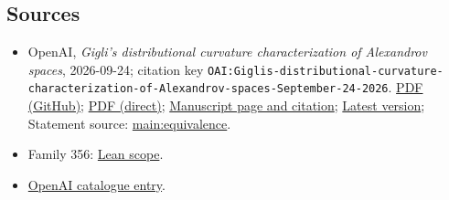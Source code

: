 \documentclass[11pt]{article}
\begin{document}
\subsection{Sources}
\begin{itemize}
\item OpenAI, \emph{Gigli's distributional curvature characterization of Alexandrov spaces}, 2026-09-24; citation key \texttt{OAI:Giglis-distributional-curvature-characterization-of-Alexandrov-spaces-September-24-2026}. \href{https://github.com/openai/math/blob/adc7f1241b42e322a6451854ab7e4b4c146bf78a/preprints/Giglis-distributional-curvature-characterization-of-Alexandrov-spaces-September-24-2026/main.pdf}{PDF (GitHub)}; \href{https://github.com/openai/math/raw/adc7f1241b42e322a6451854ab7e4b4c146bf78a/preprints/Giglis-distributional-curvature-characterization-of-Alexandrov-spaces-September-24-2026/main.pdf}{PDF (direct)}; \href{https://github.com/openai/math/blob/adc7f1241b42e322a6451854ab7e4b4c146bf78a/preprints/Giglis-distributional-curvature-characterization-of-Alexandrov-spaces-September-24-2026/README.md}{Manuscript page and citation}; \href{https://github.com/openai/math/blob/main/preprints/Giglis-distributional-curvature-characterization-of-Alexandrov-spaces-September-24-2026/main.pdf}{Latest version}; Statement source: \href{https://github.com/openai/math/blob/adc7f1241b42e322a6451854ab7e4b4c146bf78a/preprints/Giglis-distributional-curvature-characterization-of-Alexandrov-spaces-September-24-2026/build/sections/introduction.tex\#L63}{main:equivalence}.
\item Family 356: \href{https://github.com/openai/math/blob/adc7f1241b42e322a6451854ab7e4b4c146bf78a/lean/docs/356.md}{Lean scope}.
\item \href{https://github.com/openai/math/blob/adc7f1241b42e322a6451854ab7e4b4c146bf78a/CONTENTS.md}{OpenAI catalogue entry}.
\end{itemize}
\end{document}
